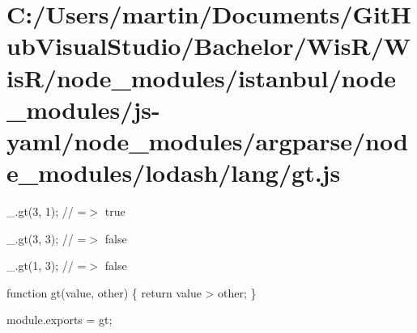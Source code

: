 \hypertarget{_c_1_2_users_2martin_2_documents_2_git_hub_visual_studio_2_bachelor_2_wis_r_2_wis_r_2node_module264da62225d2a5ed5814648b89ed2255}{}\section{C\+:/\+Users/martin/\+Documents/\+Git\+Hub\+Visual\+Studio/\+Bachelor/\+Wis\+R/\+Wis\+R/node\+\_\+modules/istanbul/node\+\_\+modules/js-\/yaml/node\+\_\+modules/argparse/node\+\_\+modules/lodash/lang/gt.\+js}
\+\_\+.\+gt(3, 1); // =$>$ true

\+\_\+.\+gt(3, 3); // =$>$ false

\+\_\+.\+gt(1, 3); // =$>$ false


\begin{DoxyCodeInclude}

\textcolor{keyword}{function} gt(value, other) \{
  \textcolor{keywordflow}{return} value > other;
\}

module.exports = gt;
\end{DoxyCodeInclude}
 